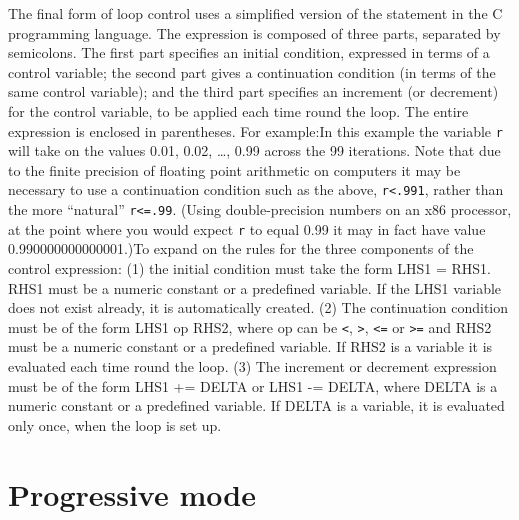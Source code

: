 The final form of loop control uses a simplified version
	of the  statement in the C programming
	language.  The expression is composed of three parts,
	separated by semicolons.  The first part specifies an initial
	condition, expressed in terms of a control variable; the
	second part gives a continuation condition (in terms of the
	same control variable); and the third part specifies an
	increment (or decrement) for the control variable, to be
	applied each time round the loop.  The entire expression is
	enclosed in parentheses.  For example:In this example the variable \verb+r+ will
	take on the values 0.01, 0.02, \dots{}, 0.99 across the 99
	iterations.  Note that due to the finite precision of floating
	point arithmetic on computers it may be necessary to use a
	continuation condition such as the above,
	\verb+r<.991+, rather than the more
	``natural'' \verb+r<=.99+.  (Using
	double-precision numbers on an x86 processor, at the point
	where you would expect \verb+r+ to equal 0.99 it
	may in fact have value 0.990000000000001.)To expand on the rules for the three components of the
	control expression: (1) the initial condition must take the
	form LHS1 = RHS1.  RHS1 must be a numeric constant or a
	predefined variable.  If the LHS1 variable does not exist
	already, it is automatically created.  (2) The continuation
	condition must be of the form LHS1
	op RHS2, where
	op can be \verb+<+,
	\verb+>+, \verb+<=+ or
	\verb+>=+ and RHS2 must be a numeric constant
	or a predefined variable.  If RHS2 is a variable it is
	evaluated each time round the loop.  (3) The increment or
	decrement expression must be of the form LHS1 += DELTA or LHS1
	-= DELTA, where DELTA is a numeric constant or a predefined
	variable.  If DELTA is a variable, it is evaluated only once,
	when the loop is set up.
      

\section{Progressive mode}
\label{loop-progressive}

